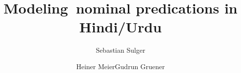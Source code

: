 \author{Sebastian Sulger\and Heiner Meier\lastand Gudrun Gruener}
\title{Modeling~nominal predications in Hindi/Urdu}
\renewcommand{\lsSeries}{eotmsig}
\renewcommand{\lsSeriesNumber}{99}

